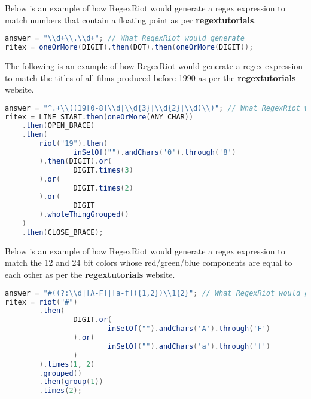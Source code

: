 \documentclass[conference]{IEEEtran}
\begin{document}
Below is an example of how RegexRiot would generate a regex expression
to match numbers that contain a floating point as per
\textbf{regextutorials}. \cite{regextutorials}

\begin{lstlisting}[language=Java]
answer = "\\d+\\.\\d+"; // What RegexRiot would generate
ritex = oneOrMore(DIGIT).then(DOT).then(oneOrMore(DIGIT));
\end{lstlisting}

The following is an example of how RegexRiot would generate a regex expression
to match the titles of all films produced before 1990 as per the
\textbf{regextutorials} website.\cite{regextutorials}

\begin{lstlisting}[language=Java]
answer = "^.+\\((19[0-8]\\d|\\d{3}|\\d{2}|\\d)\\)"; // What RegexRiot would generate
ritex = LINE_START.then(oneOrMore(ANY_CHAR))
    .then(OPEN_BRACE)
    .then(
        riot("19").then(
                inSetOf("").andChars('0').through('8')
        ).then(DIGIT).or(
                DIGIT.times(3)
        ).or(
                DIGIT.times(2)
        ).or(
                DIGIT
        ).wholeThingGrouped()
    )
    .then(CLOSE_BRACE);
    \end{lstlisting}

Below is an example of how RegexRiot would generate a regex expression to
match the 12 and 24 bit colors whose red/green/blue components are equal to
each other as per the \textbf{regextutorials} website.\cite{regextutorials}

\begin{lstlisting}[language=Java]
answer = "#((?:\\d|[A-F]|[a-f]){1,2})\\1{2}"; // What RegexRiot would generate
ritex = riot("#")
        .then(
                DIGIT.or(
                        inSetOf("").andChars('A').through('F')
                ).or(
                        inSetOf("").andChars('a').through('f')
                )
        ).times(1, 2)
        .grouped()
        .then(group(1))
        .times(2);
\end{lstlisting}
\end{document}
